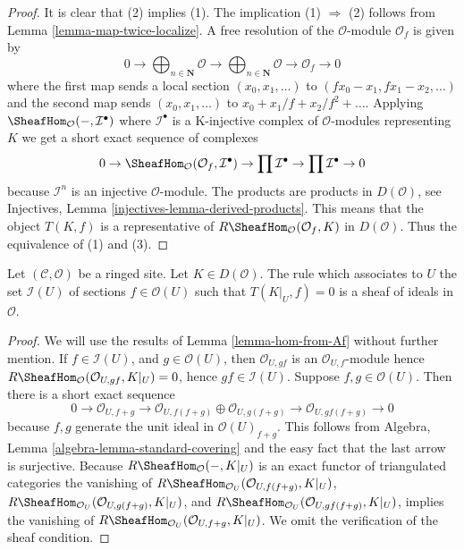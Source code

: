 \begin{proof}
It is clear that (2) implies (1). The implication (1) $\Rightarrow$ (2)
follows from Lemma \ref{lemma-map-twice-localize}.
A free resolution of the $\mathcal{O}$-module $\mathcal{O}_f$ is given by
$$
0 \to \bigoplus\nolimits_{n \in \mathbf{N}} \mathcal{O} \to
\bigoplus\nolimits_{n \in \mathbf{N}} \mathcal{O}
\to \mathcal{O}_f \to 0
$$
where the first map sends a local section $(x_0, x_1, \ldots)$ to
$(fx_0 - x_1, fx_1 - x_2, \ldots)$ and the second map sends
$(x_0, x_1, \ldots)$ to $x_0 + x_1/f + x_2/f^2 + \ldots$.
Applying $\SheafHom_\mathcal{O}(-, \mathcal{I}^\bullet)$
where $\mathcal{I}^\bullet$ is a K-injective complex of $\mathcal{O}$-modules
representing $K$ we get a short exact sequence of complexes
$$
0 \to \SheafHom_\mathcal{O}(\mathcal{O}_f, \mathcal{I}^\bullet) \to
\prod \mathcal{I}^\bullet \to \prod \mathcal{I}^\bullet \to 0
$$
because $\mathcal{I}^n$ is an injective $\mathcal{O}$-module.
The products are products in $D(\mathcal{O})$, see
Injectives, Lemma \ref{injectives-lemma-derived-products}.
This means that the object $T(K, f)$ is a representative of
$R\SheafHom_\mathcal{O}(\mathcal{O}_f, K)$ in $D(\mathcal{O})$.
Thus the equivalence of (1) and (3).
\end{proof}

\begin{lemma}
\label{lemma-ideal-of-elements-complete-wrt}
Let $(\mathcal{C}, \mathcal{O})$ be a ringed site. Let $K \in D(\mathcal{O})$.
The rule which associates to $U$ the set $\mathcal{I}(U)$
of sections $f \in \mathcal{O}(U)$ such that $T(K|_U, f) = 0$
is a sheaf of ideals in $\mathcal{O}$.
\end{lemma}

\begin{proof}
We will use the results of Lemma \ref{lemma-hom-from-Af} without further
mention. If $f \in \mathcal{I}(U)$, and $g \in \mathcal{O}(U)$, then
$\mathcal{O}_{U, gf}$ is an $\mathcal{O}_{U, f}$-module
hence $R\SheafHom_\mathcal{O}(\mathcal{O}_{U, gf}, K|_U) = 0$, hence
$gf \in \mathcal{I}(U)$. Suppose $f, g \in \mathcal{O}(U)$.
Then there is a short exact sequence
$$
0 \to \mathcal{O}_{U, f + g} \to
\mathcal{O}_{U, f(f + g)} \oplus \mathcal{O}_{U, g(f + g)} \to
\mathcal{O}_{U, gf(f + g)} \to 0
$$
because $f, g$ generate the unit ideal in $\mathcal{O}(U)_{f + g}$.
This follows from
Algebra, Lemma \ref{algebra-lemma-standard-covering}
and the easy fact that the last arrow is surjective.
Because $R\SheafHom_\mathcal{O}( - , K|_U)$ is an exact functor
of triangulated categories the vanishing of
$R\SheafHom_{\mathcal{O}_U}(\mathcal{O}_{U, f(f + g)}, K|_U)$,
$R\SheafHom_{\mathcal{O}_U}(\mathcal{O}_{U, g(f + g)}, K|_U)$, and
$R\SheafHom_{\mathcal{O}_U}(\mathcal{O}_{U, gf(f + g)}, K|_U)$,
implies the vanishing of 
$R\SheafHom_{\mathcal{O}_U}(\mathcal{O}_{U, f + g}, K|_U)$.
We omit the verification of the sheaf condition.
\end{proof}

